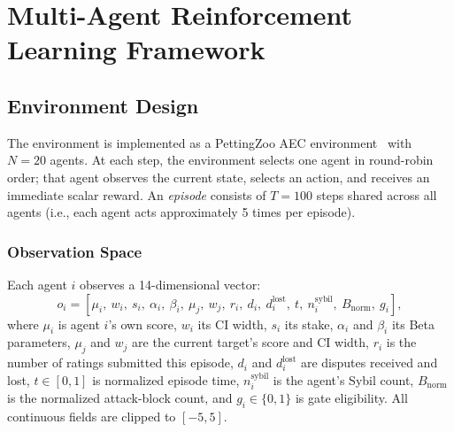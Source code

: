 \section{Multi-Agent Reinforcement Learning Framework}
\label{sec:marl}

\subsection{Environment Design}
\label{sec:env}

The environment is implemented as a PettingZoo AEC environment~\cite{terry2021pettingzoo}
with $N = 20$ agents.  At each step, the environment selects one agent in
round-robin order; that agent observes the current state, selects an action,
and receives an immediate scalar reward.  An \emph{episode} consists of
$T = 100$ steps shared across all agents (i.e., each agent acts approximately
5 times per episode).

\subsubsection{Observation Space}
Each agent $i$ observes a 14-dimensional vector:
\begin{equation}
  o_i = [\mu_i,\ w_i,\ s_i,\ \alpha_i,\ \beta_i,\ \mu_j,\ w_j,\
         r_i,\ d_i,\ d^{\text{lost}}_i,\ t,\ n^{\text{sybil}}_i,\
         B_{\text{norm}},\ g_i],
  \label{eq:obs}
\end{equation}
where $\mu_i$ is agent $i$'s own score, $w_i$ its CI width, $s_i$ its
stake, $\alpha_i$ and $\beta_i$ its Beta parameters, $\mu_j$ and $w_j$
are the current target's score and CI width, $r_i$ is the number of ratings
submitted this episode, $d_i$ and $d^{\text{lost}}_i$ are disputes received
and lost, $t \in [0,1]$ is normalized episode time, $n^{\text{sybil}}_i$
is the agent's Sybil count, $B_{\text{norm}}$ is the normalized attack-block
count, and $g_i \in \{0,1\}$ is gate eligibility.  All continuous fields
are clipped to $[-5, 5]$.

